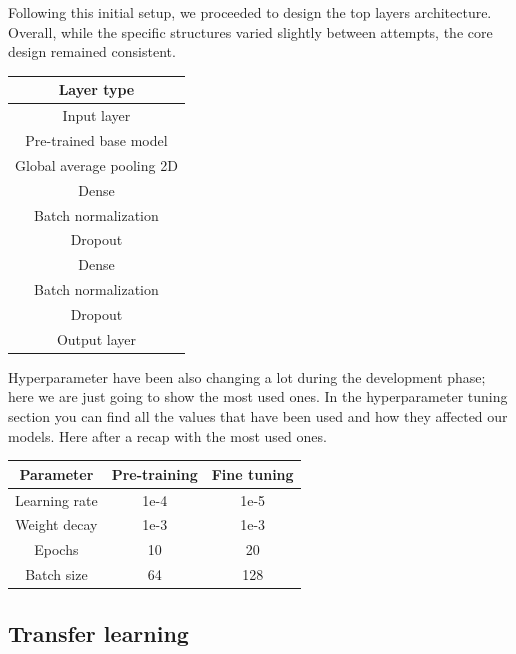 \documentclass[11pt]{article}
\begin{document}
Following this initial setup, we proceeded to design the top layers architecture. 
Overall, while the specific structures varied slightly between attempts, the core design remained consistent.

\begin{table}[h!]
    \centering
    \begin{tabular}{|c|}
        \hline
        \textbf{Layer type} \\ \hline
        Input layer \\ \hline
        Pre-trained base model \\ \hline
        Global average pooling 2D \\ \hline
        Dense \\ \hline
        Batch normalization \\ \hline
        Dropout \\ \hline
        Dense \\ \hline
        Batch normalization \\ \hline
        Dropout \\ \hline
        Output layer \\ \hline
    \end{tabular}
\end{table}

Hyperparameter have been also changing a lot during the development phase; here we are just going to show the most used ones.
In the hyperparameter tuning section you can find all the values that have been used and how they affected our models.
Here after a recap with the most used ones.

\begin{table}[h!]
    \centering
    \begin{tabular}{|c|c|c|}
        \hline
        \textbf{Parameter} & \textbf{Pre-training} & \textbf{Fine tuning} \\ \hline
        Learning rate & 1e-4 & 1e-5 \\ \hline
        Weight decay & 1e-3 & 1e-3 \\ \hline
        Epochs & 10 & 20 \\ \hline
        Batch size & 64 & 128 \\ \hline
    \end{tabular}
\end{table}

\subsection{Transfer learning}
\end{document}
